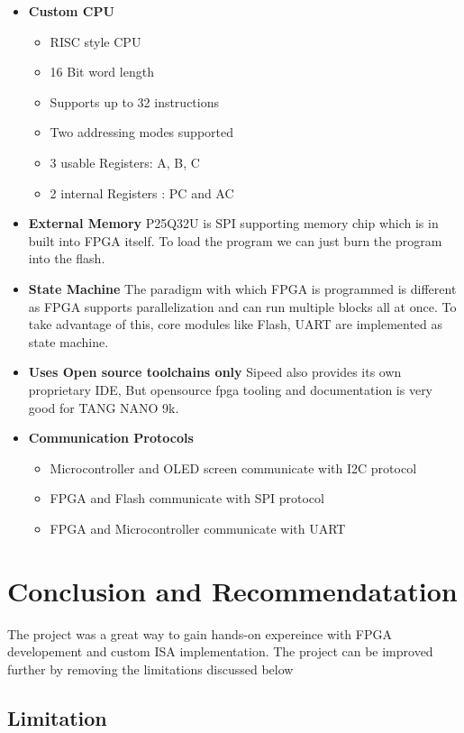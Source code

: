 \documentclass[a4paper,12pt]{article}
\begin{document}
    \begin{itemize}
        \item \textbf{Custom CPU}
        \begin{itemize}
            \item RISC style CPU  
            \item 16 Bit word length 
            \item Supports up to 32 instructions
            \item Two addressing modes supported  
            \item 3 usable Registers: A, B, C
            \item 2 internal Registers : PC and AC  
        \end{itemize}
        \item \textbf{External Memory} P25Q32U is SPI supporting memory chip which is in built into FPGA itself. To load the program we can just burn the program into the flash. 
        \item \textbf{State Machine} The paradigm with which FPGA is programmed is different as FPGA supports parallelization and can run multiple blocks all at once. To take advantage of this, core modules like Flash, UART are implemented as state machine.
        \item \textbf{Uses Open source toolchains only} Sipeed also provides its own proprietary IDE, But opensource fpga tooling and documentation is very good for TANG NANO 9k. 
        \item \textbf{Communication Protocols}
        \begin{itemize}
            \item Microcontroller and OLED screen communicate with I2C protocol 
            \item FPGA and Flash communicate with SPI protocol
            \item FPGA and Microcontroller communicate with UART  
        \end{itemize}
    \end{itemize}
    \newpage
    \section{Conclusion and Recommendatation}
    The project was a great way to gain hands-on expereince with FPGA developement and custom ISA implementation. The project can be improved further by removing the limitations discussed below

    \subsection{Limitation}
\end{document}
